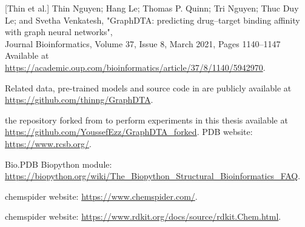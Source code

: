 \documentclass[11pt, a4paper]{article}
\begin{document}
\begin{thebibliography}{3}

    [Thin et al.] Thin Nguyen;  Hang Le; Thomas P. Quinn; Tri Nguyen; Thuc Duy Le; and
    Svetha Venkatesh, "GraphDTA: predicting drug–target binding affinity with
    graph neural networks",
    \\Journal Bioinformatics, Volume 37, Issue 8, March 2021, Pages 1140–1147
    \\Available at
    \url{https://academic.oup.com/bioinformatics/article/37/8/1140/5942970}.

    Related data, pre-trained models and source code in \cite{1} are publicly available at \url{https://github.com/thinng/GraphDTA}.

    the repository forked from \cite{2} to perform experiments in this thesis available at \url{https://github.com/YoussefEzz/GraphDTA_forked}.
PDB website: \url{https://www.rcsb.org/}.

Bio.PDB Biopython module: \url{https://biopython.org/wiki/The_Biopython_Structural_Bioinformatics_FAQ}.

chemspider website: \url{https://www.chemspider.com/}.

chemspider website: \url{https://www.rdkit.org/docs/source/rdkit.Chem.html}.

\end{thebibliography}
\end{document}
